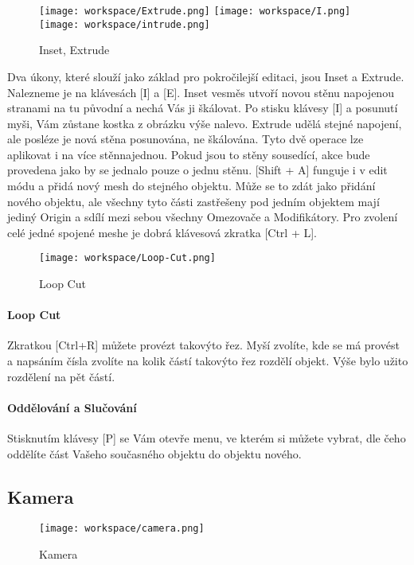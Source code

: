 \documentclass[12pt,a4paper]{report}
\begin{document}
	\begin{figure}[h]
		\centering
		\texttt{[image: workspace/Extrude.png]}
		\texttt{[image: workspace/I.png]}
		\texttt{[image: workspace/intrude.png]}
		\caption{Inset, Extrude}
		\label{pic:edit-actions}
	\end{figure}

	Dva úkony, které slouží jako základ pro pokročilejší editaci, jsou Inset a
	Extrude. Nalezneme je na klávesách [I] a [E]. Inset vesměs utvoří novou
	stěnu napojenou stranami na tu původní a nechá Vás ji škálovat. Po
	stisku klávesy [I] a posunutí myši, Vám zůstane kostka z obrázku výše
	nalevo. Extrude udělá stejné napojení, ale posléze je nová stěna
	posunována, ne škálována. Tyto dvě operace lze aplikovat i na více stěnnajednou. Pokud jsou to stěny sousedící, akce bude provedena jako by se
	jednalo pouze o jednu stěnu.
	[Shift + A] funguje i v edit módu a přidá nový mesh do stejného objektu.
	Může se to zdát jako přidání nového objektu, ale všechny tyto části
	zastřešeny pod jedním objektem mají jediný Origin a sdílí mezi sebou
	všechny Omezovače a Modifikátory. Pro zvolení celé jedné spojené meshe
	je dobrá klávesová zkratka [Ctrl + L].
	
	\begin{figure}[h]
		\centering
		\texttt{[image: workspace/Loop-Cut.png]}
		\caption{Loop Cut}
		\label{pic:loop-cut}
	\end{figure}

	\paragraph{Loop Cut} Zkratkou [Ctrl+R] můžete provézt takovýto řez. Myší zvolíte,
	kde se má provést a napsáním čísla zvolíte na kolik částí takovýto řez
	rozdělí objekt. Výše bylo užito rozdělení na pět částí.
	
	\paragraph{Oddělování a Slučování} Stisknutím klávesy [P] se Vám otevře menu,
	ve kterém si můžete vybrat, dle čeho oddělíte část Vašeho současného
	objektu do objektu nového.
	
	\subsection{Kamera}
	
	\begin{figure}[h]
		\centering
		\texttt{[image: workspace/camera.png]}
		\caption{Kamera}
		\label{pic:camera}
	\end{figure}
\end{document}
